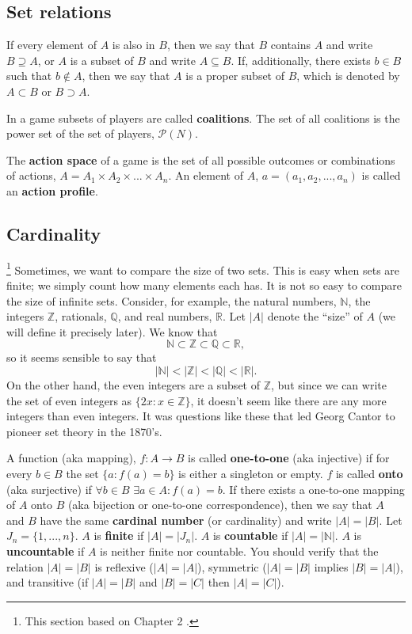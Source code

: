 \subsection{Set relations}
If every element of $A$ is also in $B$, then we say that
$B$ contains $A$ and write $B \supseteq A$, or $A$ is a subset of $B$
and write $A \subseteq B$. If, additionally, there exists $b \in B$
such that $b \not\in A$, then we say that $A$ is a proper subset of $B$,
which is denoted by $A \subset B$ or $B \supset A$. 

\begin{example} 
  In a game subsets of players are called \textbf{coalitions}. The set
  of all coalitions is the power set of the set of players,
  $\mathcal{P}(N)$. 

  The \textbf{action space} of a game is the set of all possible
  outcomes or combinations of actions, $A = A_1 \times A_2 \times
  ... \times A_n$. An element of $A$, $a = (a_1, a_2, ..., a_n)$ is
  called an \textbf{action profile}. 
\end{example}

\subsection{Cardinality \label{s:card}}

\footnote{This section based on Chapter 2 \citet{rudin1976}.} 
Sometimes, we want to compare the size of two
sets. This is easy when sets are finite; we simply count how many
elements each has. It is not so easy to compare the size of infinite
sets. Consider, for example, the natural numbers, $\mathbb{N}$, the
integers $\mathbb{Z}$, rationals, $\mathbb{Q}$, and real numbers,
$\mathbb{R}$. Let $|A|$ denote the ``size'' of $A$ (we will define it
precisely later). We know that
\[ \mathbb{N} \subset \mathbb{Z} \subset \mathbb{Q} \subset
\mathbb{R}, \]
so it seems sensible to say that 
\[ |\mathbb{N}| < |\mathbb{Z}| < |\mathbb{Q}| < |\mathbb{R}|. \] 
On the other hand, the even integers are a subset of $\mathbb{Z}$, but
since we can write the set of even integers as $\{2x: x \in \mathbb{Z}
\}$, it doesn't seem like there are any more integers than even
integers. It was questions like these that led Georg Cantor to pioneer
set theory in the 1870's. 

A function (aka mapping), $f:A \rightarrow B$ is called
\textbf{one-to-one} (aka injective) if for every $b \in B$ the set
$\{a: f(a) = b \}$ is either a singleton or empty. $f$ is called
\textbf{onto} (aka surjective) if $\forall b \in B$ $\exists a \in A:
f(a) = b$.  If there exists a one-to-one mapping of $A$ onto $B$ (aka
bijection or one-to-one correspondence), then we say that $A$ and $B$
have the same \textbf{cardinal number} (or cardinality) and write $|A|
= |B|$.  Let $J_n = \{1, ..., n \}$. $A$ is \textbf{finite} if $|A| =
|J_n|$.  $A$ is \textbf{countable} if $|A| = |\mathbb{N}|$. $A$ is
\textbf{uncountable} if $A$ is neither finite nor countable.  You
should verify that the relation $|A| = |B|$ is reflexive ($|A| =
|A|$), symmetric ($|A| = |B|$ implies $|B| = |A|$), and transitive (if
$|A| = |B|$ and $|B| = |C|$ then $|A| = |C|$). 

